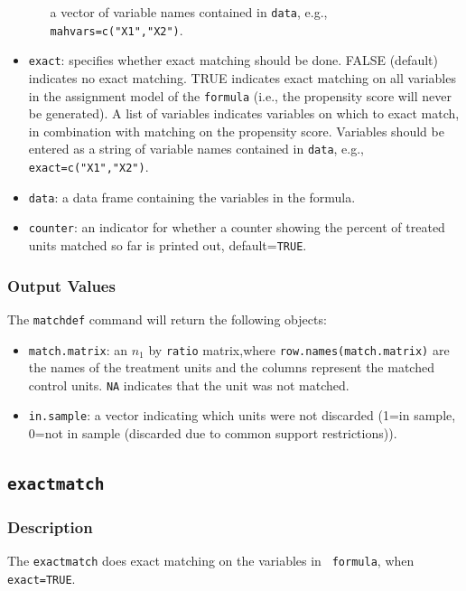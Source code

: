 \documentclass[oneside,letterpaper,titlepage]{article}
\begin{document}
\begin{appendix}
\begin{itemize}
\begin{itemize}
    a vector of variable names contained in \texttt{data}, e.g.,
    \texttt{mahvars=c("X1","X2")}.
  \end{itemize}
\item \texttt{exact}: specifies whether exact matching should be done.  FALSE
  (default) indicates no exact matching.  TRUE indicates exact
  matching on all variables in the assignment model of the
  \texttt{formula} (i.e., the propensity score will never be
  generated).  A list of variables indicates variables on which to
  exact match, in combination with matching on the propensity score.
  Variables should be entered as a string of variable names contained
  in \texttt{data}, e.g., \texttt{exact=c("X1","X2")}.
\item \texttt{data}: a data frame containing the variables in the formula.
\item \texttt{counter}: an indicator for whether a counter showing the percent
  of treated units matched so far is printed out, default={\tt TRUE}.
\end{itemize}


\subsubsection{Output Values}
The \texttt{matchdef} command will return the following objects:

\begin{itemize}
\item \texttt{match.matrix}: an $n_1$ by \texttt{ratio} matrix,where
  \texttt{row.names(match.matrix)} are the names of the
  treatment units and the columns represent the matched control units.
  \texttt{NA} indicates that the unit was not matched.
\item \texttt{in.sample}: a vector indicating which units were not discarded
  (1=in sample, 0=not in sample (discarded due to common support
  restrictions)).
\end{itemize}

\subsection{\texttt{exactmatch}}

\subsubsection{Description}
The \texttt{exactmatch} does exact matching on the variables in {\tt
  formula}, when {\tt exact=TRUE}.


\end{appendix}
\end{document}
